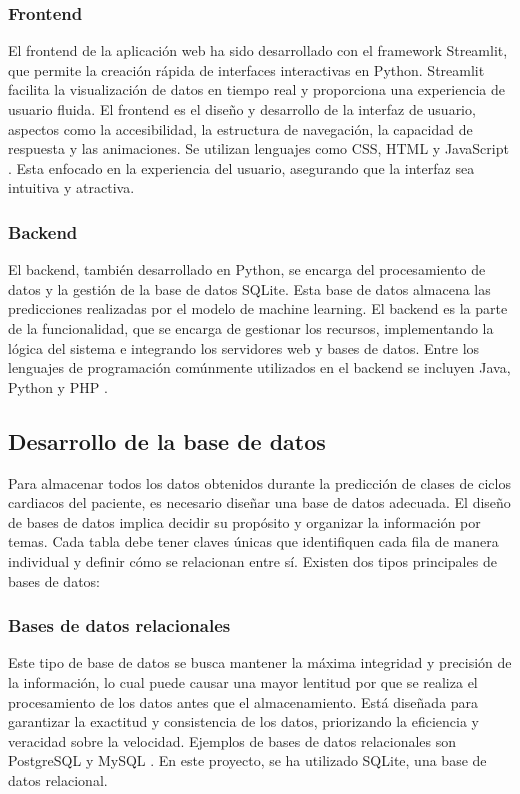 \subsubsection{Frontend}

El frontend de la aplicación web ha sido desarrollado con el framework Streamlit, que permite la creación rápida de interfaces interactivas en Python. Streamlit facilita la visualización de datos en tiempo real y proporciona una experiencia de usuario fluida. El frontend es el diseño y desarrollo de la interfaz de usuario, aspectos como la accesibilidad, la estructura de navegación, la capacidad de respuesta y las animaciones. Se utilizan lenguajes como CSS, HTML y JavaScript \cite{PrimeIT}. Esta enfocado en la experiencia del usuario, asegurando que la interfaz sea intuitiva y atractiva.

\subsubsection{Backend}

El backend, también desarrollado en Python, se encarga del procesamiento de datos y la gestión de la base de datos SQLite. Esta base de datos almacena las predicciones realizadas por el modelo de machine learning. El backend es la parte de la funcionalidad, que se encarga de gestionar los recursos, implementando la lógica del sistema e integrando los servidores web y bases de datos. Entre los lenguajes de programación comúnmente utilizados en el backend se incluyen Java, Python y PHP \cite{PrimeIT}.

\subsection{Desarrollo de la base de datos}

Para almacenar todos los datos obtenidos durante la predicción de clases de ciclos cardiacos del paciente, es necesario diseñar una base de datos adecuada. El diseño de bases de datos implica decidir su propósito y organizar la información por temas. Cada tabla debe tener claves únicas que identifiquen cada fila de manera individual y definir cómo se relacionan entre sí. Existen dos tipos principales de bases de datos:


\subsubsection{Bases de datos relacionales}

Este tipo de base de datos se busca mantener la máxima integridad y precisión de la información, lo cual puede causar una mayor lentitud por que se realiza el procesamiento de los datos antes que el almacenamiento. Está diseñada para garantizar la exactitud y consistencia de los datos, priorizando la eficiencia y veracidad sobre la velocidad. Ejemplos de bases de datos relacionales son PostgreSQL y MySQL \cite{Structuralia}. En este proyecto, se ha utilizado SQLite, una base de datos relacional.

